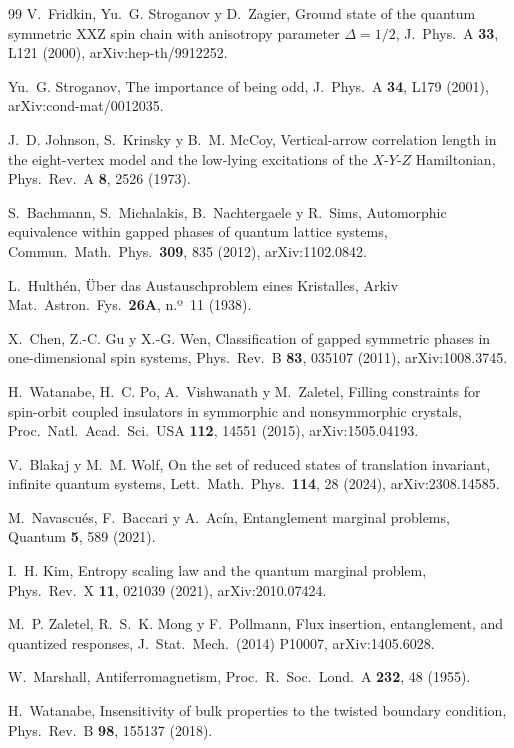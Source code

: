 \documentclass[11pt,a4paper]{article}
\theoremstyle{remark}
\begin{document}
\begin{thebibliography}{99}
V.~Fridkin, Yu.~G. Stroganov y D.~Zagier, Ground state of the quantum symmetric XXZ spin chain with
anisotropy parameter $\Delta=1/2$, J.\ Phys.\ A \textbf{33}, L121 (2000), arXiv:hep-th/9912252.

Yu.~G. Stroganov, The importance of being odd, J.\ Phys.\ A \textbf{34}, L179 (2001),
arXiv:cond-mat/0012035.

J.~D. Johnson, S.~Krinsky y B.~M. McCoy, Vertical-arrow correlation length in the eight-vertex
model and the low-lying excitations of the $X$-$Y$-$Z$ Hamiltonian, Phys.\ Rev.\ A \textbf{8}, 2526
(1973).

S.~Bachmann, S.~Michalakis, B.~Nachtergaele y R.~Sims, Automorphic equivalence within gapped
phases of quantum lattice systems, Commun.\ Math.\ Phys.\ \textbf{309}, 835 (2012),
arXiv:1102.0842.

L.~Hulthén, Über das Austauschproblem eines Kristalles, Arkiv Mat.\ Astron.\ Fys.\ \textbf{26A},
n.º~11 (1938).

X.~Chen, Z.-C. Gu y X.-G. Wen, Classification of gapped symmetric phases in one-dimensional spin
systems, Phys.\ Rev.\ B \textbf{83}, 035107 (2011), arXiv:1008.3745.

H.~Watanabe, H.~C. Po, A.~Vishwanath y M.~Zaletel, Filling constraints for spin-orbit coupled
insulators in symmorphic and nonsymmorphic crystals, Proc.\ Natl.\ Acad.\ Sci.\ USA \textbf{112},
14551 (2015), arXiv:1505.04193.

V.~Blakaj y M.~M. Wolf, On the set of reduced states of translation invariant, infinite quantum
systems, Lett.\ Math.\ Phys.\ \textbf{114}, 28 (2024), arXiv:2308.14585.

M.~Navascués, F.~Baccari y A.~Acín, Entanglement marginal problems, Quantum \textbf{5}, 589 (2021).

I.~H. Kim, Entropy scaling law and the quantum marginal problem, Phys.\ Rev.\ X \textbf{11}, 021039
(2021), arXiv:2010.07424.

M.~P. Zaletel, R.~S.~K. Mong y F.~Pollmann, Flux insertion, entanglement, and quantized responses,
J.\ Stat.\ Mech.\ (2014) P10007, arXiv:1405.6028.

W.~Marshall, Antiferromagnetism, Proc.\ R.\ Soc.\ Lond.\ A \textbf{232}, 48 (1955).

H.~Watanabe, Insensitivity of bulk properties to the twisted boundary condition, Phys.\ Rev.\ B
\textbf{98}, 155137 (2018).

\end{thebibliography}
\end{document}
